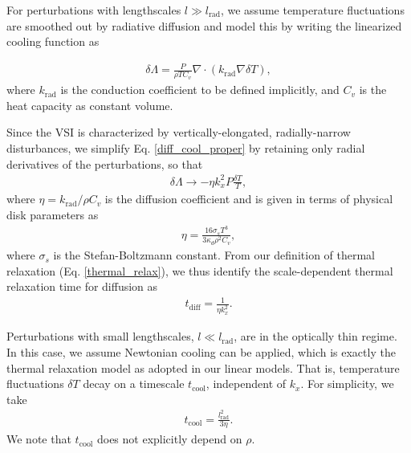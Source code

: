 For perturbations with lengthscales $l\gg l_\mathrm{rad}$, we assume
temperature fluctuations are smoothed out by radiative diffusion and
model this by writing the linearized cooling function as 

\begin{align}\label{diff_cool_proper}
  \delta \Lambda = \frac{P}{\rho T C_v} \nabla\cdot\left(k_\mathrm{rad}\nabla\delta
    T\right),  
\end{align}
where $k_\mathrm{rad}$ is the conduction coefficient to be defined
implicitly, and $C_v$ is the heat capacity as constant volume. 


Since the VSI is characterized by vertically-elongated,
radially-narrow disturbances, we simplify Eq. \ref{diff_cool_proper} 
by retaining only radial derivatives of the perturbations, so that 
\begin{align}\label{diff_cool_approx}
  \delta\Lambda \to %
  -\eta k_x^2 P \frac{\delta T}{T}, %
\end{align}
 where $\eta=k_\mathrm{rad}/\rho C_v$ is
the diffusion coefficient and 
is given in terms of physical disk parameters as 
\begin{align}\label{eta_def}
  \eta = \frac{16\sigma_s T^3}{3\kappa_d\rho^2 C_v}, 
\end{align}
where $\sigma_s$ is the Stefan-Boltzmann constant. From our
definition of thermal relaxation (Eq. \ref{thermal_relax}), 
we thus identify the scale-dependent thermal relaxation
time for diffusion as 
\begin{align}\label{tc_diff_cool} 
  t_\mathrm{diff} = \frac{1}{\eta k_x^2}.%
\end{align}

Perturbations with small lengthscales, $l\ll
l_\mathrm{rad}$, are in the optically thin regime. In this case, we assume 
Newtonian cooling can be applied, which is exactly the thermal 
relaxation model as adopted in our linear models. That is, temperature
fluctuations $\delta T$ decay on a timescale $t_\mathrm{cool}$,
independent of $k_x$. For simplicity, we take  
\begin{align}
  t_\mathrm{cool} = \frac{l_\mathrm{rad}^2}{3\eta}. 
\end{align}
We note that $t_\mathrm{cool}$ does not explicitly depend on $\rho$. 

